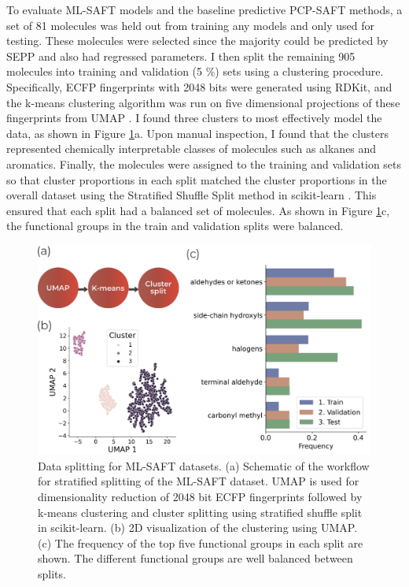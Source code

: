 To evaluate ML-SAFT models and the baseline predictive PCP-SAFT methods, a set of 81 molecules was held out from training any models and only used for testing. These molecules were selected since the majority could be predicted by SEPP and also had regressed parameters. I then split the remaining 905 molecules into training and validation (5 \%) sets using a clustering procedure. Specifically, ECFP fingerprints with 2048 bits were generated using RDKit, and the k-means clustering algorithm \cite{MacQueen1967} was run on five dimensional projections of these fingerprints from UMAP \cite{McInnes2018}. I found three clusters to most effectively model the data, as shown in Figure \ref{fig:splitting}a. Upon manual inspection, I found that the clusters represented chemically interpretable classes of molecules such as alkanes and aromatics. Finally, the molecules were assigned to the training and validation sets so that cluster proportions in each split matched the cluster proportions in the overall dataset using the Stratified Shuffle Split method in scikit-learn \cite{scikit-learn}. This ensured that each split had a balanced set of molecules. As shown in Figure \ref{fig:splitting}c, the functional groups in the train and validation splits were balanced. 

\begin{figure}
    \centering
    \includegraphics[width=\textwidth]{gfx/Chapter08/cluster_split.png}
    \caption{Data splitting for ML-SAFT datasets. (a) Schematic of the workflow for stratified splitting of the ML-SAFT dataset. UMAP\cite{McInnes2018} is used for dimensionality reduction of 2048 bit ECFP fingerprints followed by k-means clustering\cite{MacQueen1967} and cluster splitting using stratified shuffle split in scikit-learn.\cite{scikit-learn} (b) 2D visualization of the clustering using UMAP. (c) The frequency of the top five functional groups in each split are shown. The different functional groups are well balanced between splits.}
    \label{fig:splitting}
\end{figure}

